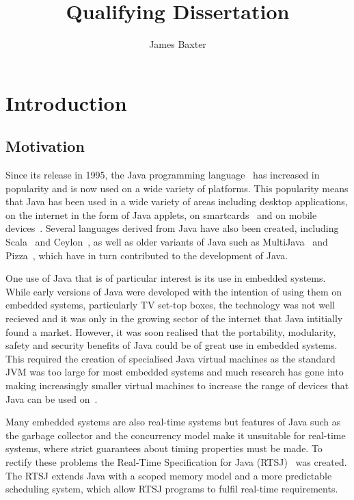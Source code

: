 \documentclass[a4paper,12pt]{article}
\title{Qualifying Dissertation}
\author{James Baxter}
\date{}
\begin{document}
\maketitle

\section{Introduction}

\subsection{Motivation}

Since its release in 1995, the Java programming language~\cite{gosling2013} has increased in popularity and is now used on a wide variety of platforms.
This popularity means that Java has been used in a wide variety of areas including desktop applications, on the internet in the form of Java applets, on smartcards~\cite{chen2000} and on mobile devices~\cite{oracle2014}.
Several languages derived from Java have also been created, including Scala~\cite{lausanne2015} and Ceylon~\cite{redhat2015}, as well as older variants of Java such as MultiJava~\cite{clifton2006} and Pizza~\cite{odersky1997}, which have in turn contributed to the development of Java.

One use of Java that is of particular interest is its use in embedded systems.
While early versions of Java were developed with the intention of using them on embedded systems, particularly TV set-top boxes, the technology was not well recieved and it was only in the growing sector of the internet that Java intitially found a market.
However, it was soon realised that the portability, modularity, safety and security benefits of Java could be of great use in embedded systems.
This required the creation of specialised Java virtual machines as the standard JVM was too large for most embedded systems and much research has gone into making increasingly smaller virtual machines to increase the range of devices that Java can be used on~\cite{caska2011,thomm2010}.

Many embedded systems are also real-time systems but features of Java such as the garbage collector and the concurrency model make it unsuitable for real-time systems, where strict guarantees about timing properties must be made.
To rectify these problems the Real-Time Specification for Java (RTSJ)~\cite{gosling2000} was created.
The RTSJ extends Java with a scoped memory model and a more predictable scheduling system, which allow RTSJ programs to fulfil real-time requirements.
\end{document}
